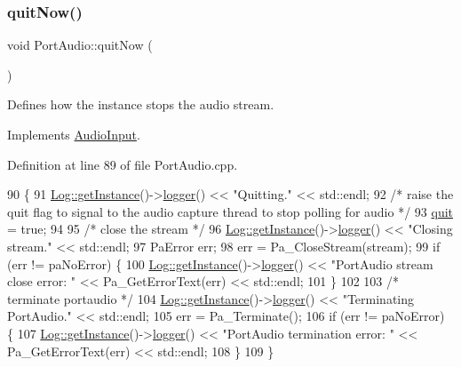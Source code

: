 \mbox{\label{classPortAudio_a88fc85aad0b14014b0775ec0a769ea0a}} 
\subsubsection{\texorpdfstring{quit\+Now()}{quitNow()}}
{\footnotesize\ttfamily void Port\+Audio\+::quit\+Now (\begin{DoxyParamCaption}{ }\end{DoxyParamCaption})\hspace{0.3cm}{\ttfamily [virtual]}}

Defines how the instance stops the audio stream. 

Implements \mbox{\hyperlink{classAudioInput_a4fce5476455b1df813f1cb6eebb08311}{Audio\+Input}}.



Definition at line 89 of file Port\+Audio.\+cpp.


\begin{DoxyCode}
90 \{
91     \mbox{\hyperlink{classLog_a987f3ff401eea783d0e80daaea1d7aca}{Log::getInstance}}()->\mbox{\hyperlink{classLog_a32d048a4924c7851c4b7b16758675af6}{logger}}() << \textcolor{stringliteral}{"Quitting."} << std::endl;
92     \textcolor{comment}{/* raise the quit flag to signal to the audio capture thread to stop polling for audio */}
93     \mbox{\hyperlink{classAudioInput_aceef1c12e4f78624ed695371adf495df}{quit}} = \textcolor{keyword}{true};
94 
95     \textcolor{comment}{/* close the stream */}
96     \mbox{\hyperlink{classLog_a987f3ff401eea783d0e80daaea1d7aca}{Log::getInstance}}()->\mbox{\hyperlink{classLog_a32d048a4924c7851c4b7b16758675af6}{logger}}() << \textcolor{stringliteral}{"Closing stream."} << std::endl;
97     PaError err;
98     err = Pa\_CloseStream(stream);
99     \textcolor{keywordflow}{if} (err != paNoError) \{
100         \mbox{\hyperlink{classLog_a987f3ff401eea783d0e80daaea1d7aca}{Log::getInstance}}()->\mbox{\hyperlink{classLog_a32d048a4924c7851c4b7b16758675af6}{logger}}() << \textcolor{stringliteral}{"PortAudio stream close error: "} << 
      Pa\_GetErrorText(err) << std::endl;
101     \}
102     
103     \textcolor{comment}{/* terminate portaudio */}
104     \mbox{\hyperlink{classLog_a987f3ff401eea783d0e80daaea1d7aca}{Log::getInstance}}()->\mbox{\hyperlink{classLog_a32d048a4924c7851c4b7b16758675af6}{logger}}() << \textcolor{stringliteral}{"Terminating PortAudio."} << std::endl;
105     err = Pa\_Terminate();
106     \textcolor{keywordflow}{if} (err != paNoError) \{
107         \mbox{\hyperlink{classLog_a987f3ff401eea783d0e80daaea1d7aca}{Log::getInstance}}()->\mbox{\hyperlink{classLog_a32d048a4924c7851c4b7b16758675af6}{logger}}() << \textcolor{stringliteral}{"PortAudio termination error: "} << 
      Pa\_GetErrorText(err) << std::endl;
108     \}
109 \}
\end{DoxyCode}
\mbox{\label{classPortAudio_a2685650c8e1568f8089babd3af5f6bc1}} 
